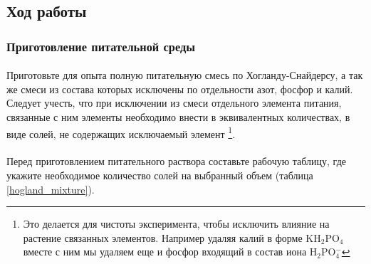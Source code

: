 \subsection*{Ход работы}	
	
\subsubsection*{Приготовление питательной среды}
	
\paragraph*{}Приготовьте для опыта полную питательную смесь по Хогланду-Снайдерсу, а так же смеси из состава которых исключены по отдельности азот, фосфор и калий. Следует учесть, что при исключении из смеси отдельного элемента питания, связанные с ним элементы необходимо внести в эквивалентных количествах, в виде солей, не содержащих исключаемый элемент \footnote{Это делается для чистоты эксперимента, чтобы исключить влияние на растение  связанных элементов. Например удаляя калий в форме   K{H$_2$}PO{$_4$} вместе с ним мы удаляем еще и фосфор входящий в состав иона {H$_2$}PO{$_4^-$}}. 

\paragraph*{}Перед приготовлением питательного раствора составьте рабочую таблицу, где укажите необходимое количество солей на выбранный объем (таблица \ref{hogland_mixture}).

